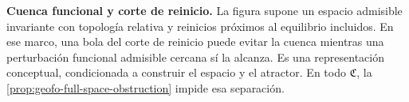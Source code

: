 \begin{center}
{%
}
\par\smallskip
\begin{minipage}{0.92\linewidth}
\small\textbf{Cuenca funcional y corte de reinicio.}
La figura supone un espacio admisible invariante con topología relativa y
reinicios próximos al equilibrio incluidos. En ese marco, una bola del corte
de reinicio puede evitar la cuenca mientras una perturbación funcional
admisible cercana sí la alcanza. Es una representación conceptual, condicionada
a construir el espacio y el atractor. En todo \(\mathfrak C\), la
\cref{prop:geofo-full-space-obstruction} impide esa separación.
\end{minipage}
\end{center}
